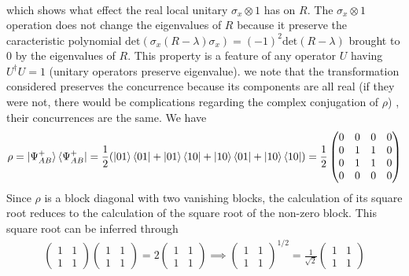 \documentclass[10pt, a4paper]{article}
\begin{document}
{\begin{enumerate}
{\begin{align*}
  \end{align*}
  which shows what effect the real local unitary $\sigma_x \otimes 1$ has on $R$. The $\sigma_x \otimes 1$ operation does not change the eigenvalues of $R$ because it preserve the caracteristic polynomial $\text{det}(\sigma_x (R - \lambda)\sigma_x) = (-1)^2 \text{det}(R - \lambda)$ brought to $0$ by the eigenvalues of $R$. This property is a feature of any operator $U$ having $U^\dagger U = 1$ (unitary operators preserve eigenvalue). we note that the transformation considered preserves the concurrence because its components are all real (if they were not, there would be complications regarding the complex conjugation of $\rho$)}
  , their concurrences are the same. We have 
  \begin{align*}
    \rho = \ket{\Psi^{+}_{AB}} \bra{\Psi^{+}_{AB}} = \frac{1}{2}(\ket{01}\bra{01} + \ket{01}\bra{10}  + \ket{10}\bra{01} + \ket{10}\bra{10}) = \frac{1}{2}
    \begin{pmatrix}
      0 & 0 & 0 & 0\\
      0 & 1 & 1 & 0\\
      0 & 1 & 1 & 0\\
      0 & 0 & 0 & 0
    \end{pmatrix}
  \end{align*}
  Since $\rho$ is a block diagonal with two vanishing blocks, the calculation of its square root reduces to the calculation of the square root of the non-zero block. This square root can be inferred through 
  \begin{align*} 
    \begin{pmatrix}
      1 & 1\\
      1 & 1
    \end{pmatrix}
    \begin{pmatrix}
      1 & 1\\
      1 & 1
    \end{pmatrix}
    = 2
    \begin{pmatrix}
      1 & 1\\
      1 & 1
    \end{pmatrix} \implies \begin{pmatrix}
      1 & 1\\
      1 & 1
    \end{pmatrix}^{1/2} = \frac{1}{\sqrt{2}}\begin{pmatrix}
      1 & 1\\
      1 & 1
    \end{pmatrix}
  \end{align*}

\end{enumerate}}
\end{document}
